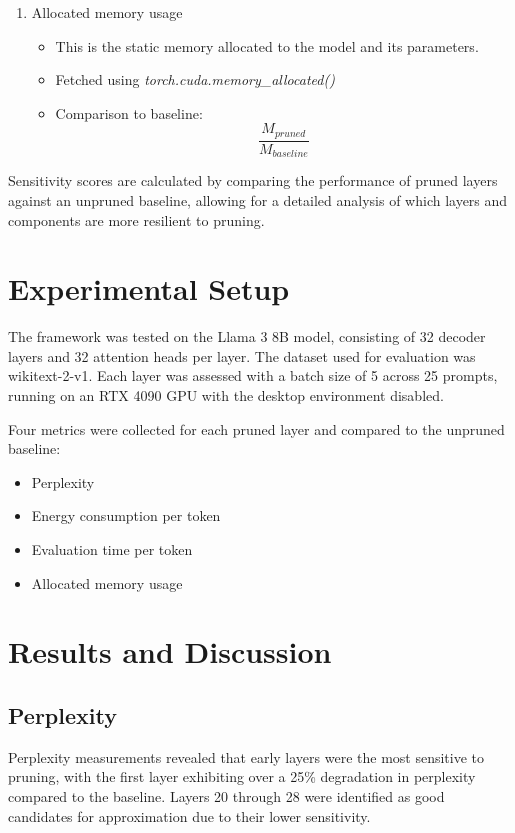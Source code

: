 \documentclass[conference]{IEEEtran}
\begin{document}
\begin{enumerate}
\begin{itemize}
        \end{itemize}
        \item Allocated memory usage
        \begin{itemize}
            \item This is the static memory allocated to the model and its parameters.
            \item Fetched using \textit{torch.cuda.memory\_allocated()}
            \item Comparison to baseline:
            \\
            \begin{equation}
                \frac{M_{pruned}}{M_{baseline}}
                \label{eq:memory_time_comparison}
            \end{equation}
        \end{itemize}
    \end{enumerate}


    Sensitivity scores are calculated by comparing the performance of pruned layers against an unpruned baseline, allowing for a detailed analysis of which layers and components are more resilient to pruning.

    \section{Experimental Setup}
    The framework was tested on the Llama 3 8B model, consisting of 32 decoder layers and 32 attention heads per layer.
    The dataset used for evaluation was wikitext-2-v1.
    Each layer was assessed with a batch size of 5 across 25 prompts, running on an RTX 4090 GPU with the desktop environment disabled.

    Four metrics were collected for each pruned layer and compared to the unpruned baseline:
    \begin{itemize}
        \item Perplexity
        \item Energy consumption per token
        \item Evaluation time per token
        \item Allocated memory usage
    \end{itemize}

    \section{Results and Discussion}
    \subsection{Perplexity}
    Perplexity measurements revealed that early layers were the most sensitive to pruning, with the first layer exhibiting over a 25\% degradation in perplexity compared to the baseline. Layers 20 through 28 were identified as good candidates for approximation due to their lower sensitivity.
\end{document}
